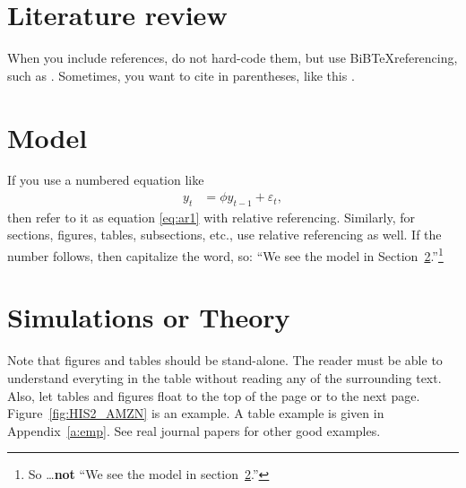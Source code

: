 \documentclass[a4paper,12pt]{article}
\begin{document}
\section{Literature review} \label{s:lit_rev}

When you include references, do not hard-code them, but use BiB\TeX referencing, such as \cite{Arnade}.
Sometimes, you want to cite in parentheses, like this \citep[see the last page of][pg. 1033]{Arnade}.

\section{Model} \label{s:model}

If you use a numbered equation like 
\begin{align}
	\label{eq:ar1}
	y_t &= \phi y_{t-1} + \varepsilon_t,
\end{align}
then refer to it as equation \eqref{eq:ar1} with relative referencing. Similarly, for sections, figures, tables, subsections, etc., use relative referencing as well. If the number follows, then capitalize the word, so: ``We see the model in Section~\ref{s:model}.''\footnote{So \ldots \textbf{not} ``We see the model in section~\ref{s:model}.''}

\section{Simulations or Theory} \label{s:sim}

Note that figures and tables should be stand-alone.
The reader must be able to understand everyting in the table without reading any of the surrounding text.
Also, let tables and figures float to the top of the page or to the next page. Figure~\ref{fig:HIS2_AMZN} is an example. A table example is given in Appendix~\ref{a:emp}.
See real journal papers for other good examples.
\end{document}
